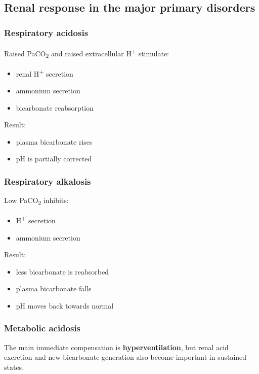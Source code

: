 \documentclass[11pt,a4paper]{article}
\begin{document}
\subsection{Renal response in the major primary disorders}

\subsubsection{Respiratory acidosis}

Raised PaCO\textsubscript{2} and raised extracellular H\textsuperscript{+} stimulate:
\begin{itemize}
  \item renal H\textsuperscript{+} secretion
  \item ammonium secretion
  \item bicarbonate reabsorption
\end{itemize}

Result:
\begin{itemize}
  \item plasma bicarbonate rises
  \item pH is partially corrected
\end{itemize}

\subsubsection{Respiratory alkalosis}

Low PaCO\textsubscript{2} inhibits:
\begin{itemize}
  \item H\textsuperscript{+} secretion
  \item ammonium secretion
\end{itemize}

Result:
\begin{itemize}
  \item less bicarbonate is reabsorbed
  \item plasma bicarbonate falls
  \item pH moves back towards normal
\end{itemize}

\subsubsection{Metabolic acidosis}

The main immediate compensation is \textbf{hyperventilation}, but renal acid excretion and new bicarbonate generation also become important in sustained states.
\end{document}
